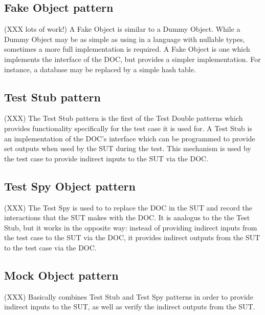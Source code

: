 
\subsection{Fake Object pattern}
\label{testdoubles:fake}

(XXX lots of work!) A Fake Object is similar to a Dummy Object. While
a Dummy Object may be as simple as using  in a language
with nullable types, sometimes a more full implementation is
required. A Fake Object is one which implements the interface of the
DOC, but provides a simpler implementation. For instance, a database
may be replaced by a simple hash table.


\subsection{Test Stub pattern}
\label{testdoubles:stub}

(XXX) The Test Stub pattern is the first of the Test Double patterns
which provides functionality specifically for the test case it is used
for. A Test Stub is an implementation of the DOC's interface which can
be programmed to provide set outputs when used by the SUT during the
test. This mechanism is used by the test case to provide indirect
inputs to the SUT via the DOC.


\subsection{Test Spy Object pattern}
\label{testdoubles:spy}

(XXX) The Test Spy is used to to replace the DOC in the SUT and record
the interactions that the SUT makes with the DOC. It is analogus to
the the Test Stub, but it works in the opposite way: instead of
providing indirect inputs from the test case to the SUT via the DOC,
it provides indirect outputs from the SUT to the test case via the
DOC.

\subsection{Mock Object pattern}
\label{testdoubles:mocks}

(XXX) Basically combines Test Stub and Test Spy patterns in order to
provide indirect inputs to the SUT, as well as verify the indirect
outputs from the SUT.


